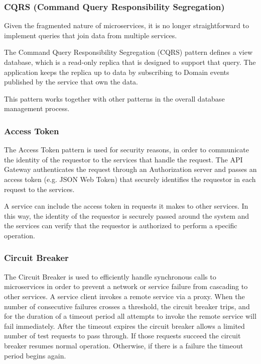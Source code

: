 \subsubsection{CQRS (Command Query Responsibility Segregation)}
Given the fragmented nature of microservices, it is no longer straightforward to implement queries that join data from multiple services. 

The Command Query Responsibility Segregation (CQRS) pattern defines a view database, which is a read-only replica that is designed to support that query. The application keeps the replica up to data by subscribing to Domain events published by the service that own the data. 

This pattern works together with other patterns in the overall database management process.

\subsubsection{Access Token}
The Access Token pattern is used for security reasons, in order to communicate the identity of the requestor to the services that handle the request. The API Gateway authenticates the request through an Authorization server and passes an access token (e.g. JSON Web Token) that securely identifies the requestor in each request to the services. 

A service can include the access token in requests it makes to other services. In this way, the identity of the requestor is securely passed around the system and the services can verify that the requestor is authorized to perform a specific operation.

\subsubsection{Circuit Breaker}
The Circuit Breaker is used to efficiently handle synchronous calls to microservices in order to prevent a network or service failure from cascading to other services.
A service client invokes a remote service via a proxy. When the number of consecutive failures crosses a threshold, the circuit breaker trips, and for the duration of a timeout period all attempts to invoke the remote service will fail immediately. After the timeout expires the circuit breaker allows a limited number of test requests to pass through. If those requests succeed the circuit breaker resumes normal operation. Otherwise, if there is a failure the timeout period begins again.

